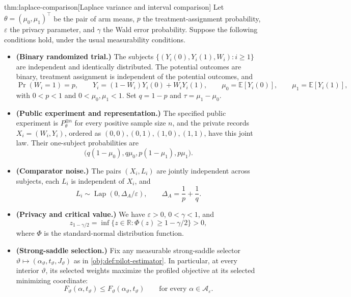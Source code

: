 \documentclass[11pt]{article}
\begin{document}
\begin{theoremv}{thm:laplace-comparison}[Laplace variance and interval comparison]
Let \(\theta=(\mu_0,\mu_1)^\top\) be the pair of arm means, \(p\) the treatment-assignment probability, \(\varepsilon\) the privacy parameter, and \(\gamma\) the Wald error probability. Suppose the following conditions hold, under the usual measurability conditions.
\begin{itemize}
\item \textbf{(Binary randomized trial.)} The subjects \(\{(Y_i(0),Y_i(1),W_i):i\ge1\}\) are independent and identically distributed. The potential outcomes are binary, treatment assignment is independent of the potential outcomes, and
\[
\Pr(W_i=1)=p,\qquad
Y_i=(1-W_i)Y_i(0)+W_iY_i(1),\qquad
\mu_0=\mathbb E[Y_i(0)],\qquad
\mu_1=\mathbb E[Y_i(1)],
\]
with \(0<p<1\) and \(0<\mu_0,\mu_1<1\). Set \(q=1-p\) and \(\tau=\mu_1-\mu_0\).
\item \textbf{(Public experiment and representation.)} The specified public experiment is \(P_\theta^{\otimes n}\) for every positive sample size \(n\), and the private records \(X_i=(W_i,Y_i)\), ordered as \((0,0),(0,1),(1,0),(1,1)\), have this joint law. Their one-subject probabilities are
\[
\bigl(q(1-\mu_0),q\mu_0,p(1-\mu_1),p\mu_1\bigr).
\]
\item \textbf{(Comparator noise.)} The pairs \((X_i,L_i)\) are jointly independent across subjects, each \(L_i\) is independent of \(X_i\), and
\[
L_i\sim\operatorname{Lap}(0,\Delta_A/\varepsilon),
\qquad
\Delta_A=\frac1p+\frac1q.
\]
\item \textbf{(Privacy and critical value.)} We have \(\varepsilon>0\), \(0<\gamma<1\), and
\[
z_{1-\gamma/2}
=\inf\{z\in\mathbb R:\Phi(z)\ge1-\gamma/2\}>0,
\]
where \(\Phi\) is the standard-normal distribution function.
\item \textbf{(Strong-saddle selection.)} Fix any measurable strong-saddle selector
\(\vartheta\mapsto(\alpha_\vartheta,t_\vartheta,J_\vartheta)\)
as in \cref{obj:def:pilot-estimator}. In particular, at every interior \(\vartheta\), its selected weights maximize the profiled objective at its selected minimizing coordinate:
\[
F_\vartheta(\alpha,t_\vartheta)
\le F_\vartheta(\alpha_\vartheta,t_\vartheta)
\qquad\text{for every }\alpha\in\mathcal A_\varepsilon.
\]
\end{itemize}


\end{theoremv}
\end{document}
